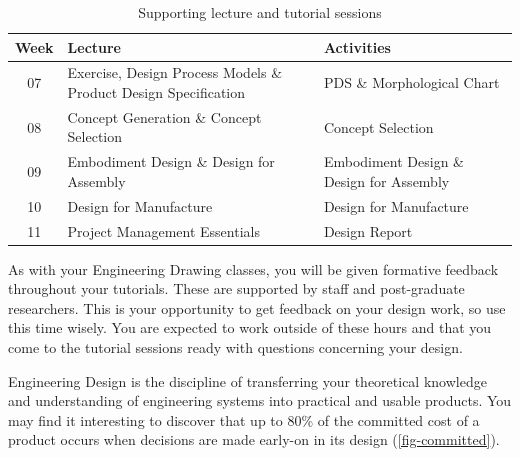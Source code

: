 \begin{table}[h!]
  \caption{Supporting lecture and tutorial sessions}
  \label{tbl-lectures}
  \small
  \centering
  \footnotesize
  \begin{tabular}{c p{} p{}}
      \toprule
      
      Week & Lecture & Activities \\
      
      \midrule

      07 & 
      Exercise, Design Process Models \& Product Design Specification & 
      PDS \& Morphological Chart \\
      
      08 & 
      Concept Generation \& Concept Selection 
      & Concept Selection \\
      
      09 & 
      Embodiment Design \& Design for Assembly & 
      Embodiment Design \& Design for Assembly \\
      
      10 & 
      Design for Manufacture & 
      Design for Manufacture \\
      
      11 & 
      Project Management Essentials & 
      Design Report \\

  \bottomrule
  \end{tabular}
\end{table}


As with your Engineering Drawing classes, you will be given formative feedback throughout your tutorials. These are supported by staff and post-graduate researchers. This is your opportunity to get feedback on your design work, so use this time wisely. You are expected to work outside of these hours and that you come to the tutorial sessions ready with questions concerning your design.

Engineering Design is the discipline of transferring your theoretical knowledge and understanding of engineering systems into practical and usable products. You may find it interesting to discover that up to 80\% of the committed cost of a product occurs when decisions are made early-on in its design (\cref{fig-committed}).\cite{ullman2002}\cite{corbett1986}\cite{mileham1993}

